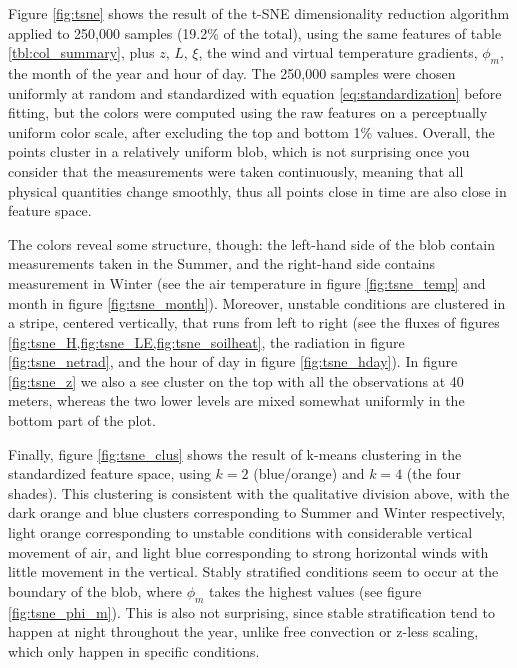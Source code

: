 \documentclass[a4paper]{book}
\begin{document}
Figure \ref{fig:tsne} shows the result of the t-SNE dimensionality reduction algorithm \citep{tsne} applied to 250,000 samples (19.2\% of the total), using the same features of table \ref{tbl:col_summary}, plus $z$, $L$, $\xi$, the wind and virtual temperature gradients, $\phi_m$, the month of the year and hour of day. The 250,000 samples were chosen uniformly at random and standardized with equation \ref{eq:standardization} before fitting, but the colors were computed using the raw features on a perceptually uniform color scale, after excluding the top and bottom 1\% values. Overall, the points cluster in a relatively uniform blob, which is not surprising once you consider that the measurements were taken continuously, meaning that all physical quantities change smoothly, thus all points close in time are also close in feature space.

The colors reveal some structure, though: the left-hand side of the blob contain measurements taken in the Summer, and the right-hand side contains measurement in Winter (see the air temperature in figure \ref{fig:tsne_temp} and month in figure \ref{fig:tsne_month}). Moreover, unstable conditions are clustered in a stripe, centered vertically, that runs from left to right (see the fluxes of figures \cref{fig:tsne_H,fig:tsne_LE,fig:tsne_soilheat}, the radiation in figure \ref{fig:tsne_netrad}, and the hour of day in figure \ref{fig:tsne_hday}). In figure \ref{fig:tsne_z} we also a see cluster on the top with all the observations at 40 meters, whereas the two lower levels are mixed somewhat uniformly in the bottom part of the plot.

Finally, figure \ref{fig:tsne_clus} shows the result of k-means clustering in the standardized feature space, using $k=2$ (blue/orange) and $k=4$ (the four shades). This clustering is consistent with the qualitative division above, with the dark orange and blue clusters corresponding to Summer and Winter respectively, light orange corresponding to unstable conditions with considerable vertical movement of air, and light blue corresponding to strong horizontal winds with little movement in the vertical. Stably stratified conditions seem to occur at the boundary of the blob, where $\phi_m$ takes the highest values (see figure \ref{fig:tsne_phi_m}). This is also not surprising, since stable stratification tend to happen at night throughout the year, unlike free convection or z-less scaling, which only happen in specific conditions.
\end{document}
